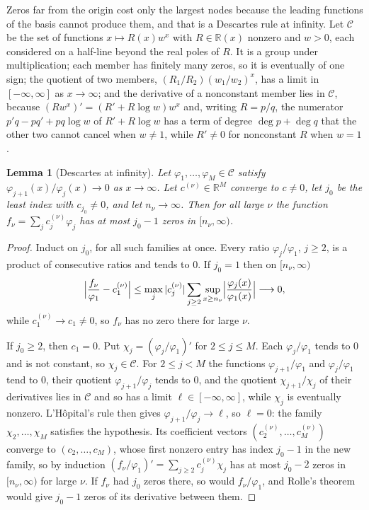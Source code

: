 \documentclass[11pt]{article}
\newtheorem{lemma}[theorem]{Lemma}
\theoremstyle{definition}
\theoremstyle{plain}
\newcommand{\R}{\mathbb R}
\begin{document}
Zeros far from the origin cost only the largest nodes because the leading
functions of the basis cannot produce them, and that is a Descartes rule at
infinity.  Let $\mathcal C$ be the
set of functions $x\mapsto R(x)w^x$ with $R\in\R(x)$ nonzero and $w>0$, each
considered on a half-line beyond the real poles of $R$.  It is a group under
multiplication; each member has finitely many zeros, so it is eventually of
one sign; the quotient of two members,
$(R_1/R_2)(w_1/w_2)^x$, has a limit in $[-\infty,\infty]$ as $x\to\infty$;
and the derivative of a nonconstant member lies in $\mathcal C$, because
$(Rw^x)'=(R'+R\log w)w^x$ and, writing $R=p/q$, the numerator
$p'q-pq'+pq\log w$ of $R'+R\log w$ has a term of degree $\deg p+\deg q$ that
the other two cannot cancel when $w\ne1$, while $R'\ne0$ for nonconstant $R$
when $w=1$.

\begin{lemma}[Descartes at infinity]\label{lem:infinity}
Let $\varphi_1,\ldots,\varphi_M\in\mathcal C$ satisfy
$\varphi_{j+1}(x)/\varphi_j(x)\to0$ as $x\to\infty$.  Let
$c^{(\nu)}\in\R^M$ converge to $c\ne0$, let $j_0$ be the least index with
$c_{j_0}\ne0$, and let $n_\nu\to\infty$.  Then for all large $\nu$ the
function $f_\nu=\sum_jc^{(\nu)}_j\varphi_j$ has at most $j_0-1$ zeros in
$[n_\nu,\infty)$.
\end{lemma}

\begin{proof}
Induct on $j_0$, for all such families at once.  Every ratio
$\varphi_j/\varphi_1$, $j\ge2$, is a product of consecutive ratios and tends
to $0$.  If $j_0=1$ then on $[n_\nu,\infty)$
\[
  \Bigl|\frac{f_\nu}{\varphi_1}-c^{(\nu)}_1\Bigr|
  \le\max_j|c^{(\nu)}_j|\sum_{j\ge2}\sup_{x\ge n_\nu}
  \Bigl|\frac{\varphi_j(x)}{\varphi_1(x)}\Bigr|\longrightarrow0,
\]
while $c^{(\nu)}_1\to c_1\ne0$, so $f_\nu$ has no zero there for large $\nu$.

If $j_0\ge2$, then $c_1=0$.  Put $\chi_j=(\varphi_j/\varphi_1)'$ for
$2\le j\le M$.  Each $\varphi_j/\varphi_1$ tends to $0$ and is not constant,
so $\chi_j\in\mathcal C$.  For $2\le j<M$ the functions
$\varphi_{j+1}/\varphi_1$ and $\varphi_j/\varphi_1$ tend to $0$, their
quotient $\varphi_{j+1}/\varphi_j$ tends to $0$, and the quotient
$\chi_{j+1}/\chi_j$ of their derivatives lies in $\mathcal C$ and so has a
limit $\ell\in[-\infty,\infty]$, while $\chi_j$ is eventually nonzero.
L'H\^opital's rule then gives $\varphi_{j+1}/\varphi_j\to\ell$, so $\ell=0$:
the family $\chi_2,\ldots,\chi_M$ satisfies the hypothesis.  Its coefficient
vectors $(c^{(\nu)}_2,\ldots,c^{(\nu)}_M)$ converge to $(c_2,\ldots,c_M)$,
whose first nonzero entry has index $j_0-1$ in the new family, so by induction
$(f_\nu/\varphi_1)'=\sum_{j\ge2}c^{(\nu)}_j\chi_j$ has at most $j_0-2$ zeros
in $[n_\nu,\infty)$ for large $\nu$.  If $f_\nu$ had $j_0$ zeros there, so
would $f_\nu/\varphi_1$, and Rolle's theorem would give $j_0-1$ zeros of its
derivative between them.
\end{proof}
\end{document}

